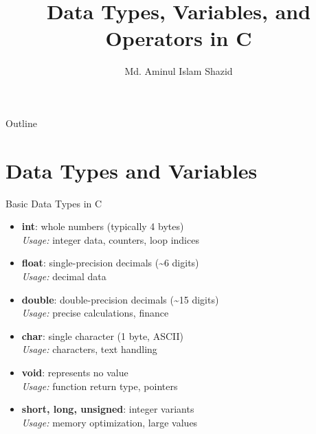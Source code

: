 \documentclass[12pt, aspectratio=169]{beamer}
\title{Data Types, Variables, and Operators in C}
\author{Md. Aminul Islam Shazid}
\date{}
\begin{document}
    {
		\addtocounter{framenumber}{-2}    %

		\begin{frame}
			\titlepage
		\end{frame}

		\begin{frame}{Outline}
            \vfill
			\tableofcontents[subsectionstyle=hide]
            \vfill
		\end{frame}
	}

    \section{Data Types and Variables}

    \begin{frame}{Basic Data Types in C}
        \begin{itemize}
            \item \textbf{int}: whole numbers (typically 4 bytes) \\
                \textit{Usage:} integer data, counters, loop indices
            \item \textbf{float}: single-precision decimals (\~{}6 digits) \\
                \textit{Usage:} decimal data
            \item \textbf{double}: double-precision decimals (\~{}15 digits) \\
                \textit{Usage:} precise calculations, finance
            \item \textbf{char}: single character (1 byte, ASCII) \\
                \textit{Usage:} characters, text handling
            \item \textbf{void}: represents no value \\
                \textit{Usage:} function return type, pointers
            \item \textbf{short, long, unsigned}: integer variants \\
                \textit{Usage:} memory optimization, large values
        \end{itemize}
    \end{frame}
\end{document}
